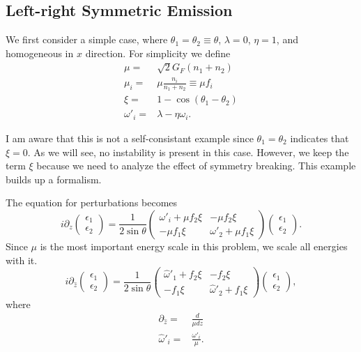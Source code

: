 \subsection{Left-right Symmetric Emission}


We first consider a simple case, where $\theta_1=\theta_2\equiv\theta$, $\lambda=0$, $\eta=1$, and homogeneous in $x$ direction. For simplicity we define
\begin{align*}
   \mu =& \sqrt{2}G_F (n_1 + n_2)\\
   \mu_i =& \mu \frac{n_i}{n_1+n_2}\equiv \mu f_i \\
   \xi = & 1-\cos(\theta_1-\theta_2)\\
   \omega'_i = & \lambda - \eta\omega_i.
\end{align*}

I am aware that this is not a self-consistant example since $\theta_1=\theta_2$ indicates that $\xi=0$. As we will see, no instability is present in this case. However, we keep the term $\xi$ because we need to analyze the effect of symmetry breaking. This example builds up a formalism.

The equation for perturbations becomes
\begin{equation}
   i\partial_z\begin{pmatrix}
   \epsilon_1 \\
   \epsilon_2
   \end{pmatrix} = \frac{1}{2\sin\theta} \begin{pmatrix}
   \omega'_i + \mu f_2\xi & -\mu f_2 \xi \\
   -\mu f_1 \xi & \omega'_2 + \mu f_1 \xi
   \end{pmatrix}\begin{pmatrix}
   \epsilon_1 \\
   \epsilon_2
   \end{pmatrix}.
   \label{eqn-linearized-eom-symmetric-eg}
\end{equation}
Since $\mu$ is the most important energy scale in this problem, we scale all energies with it.
\begin{equation}
   i\partial_{\hat z}\begin{pmatrix}
   \epsilon_1 \\
   \epsilon_2
   \end{pmatrix} = \frac{1}{2\sin\theta} \begin{pmatrix}
   \hat\omega'_1 +  f_2\xi & - f_2 \xi \\
   - f_1 \xi & \hat\omega'_2 +  f_1 \xi
   \end{pmatrix}\begin{pmatrix}
   \epsilon_1 \\
   \epsilon_2
   \end{pmatrix},
\end{equation}
where
\begin{align*}
   \partial_{\hat z} =& \frac{d}{\mu dz} \\
   \hat \omega'_i =& \frac{\omega'_i}{\mu}.
\end{align*}


